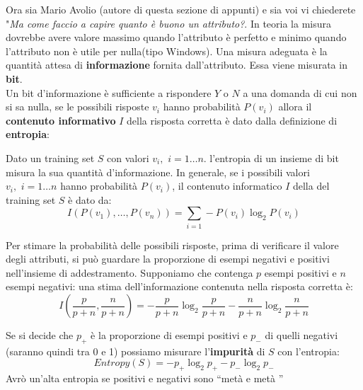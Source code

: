 Ora sia Mario Avolio (autore di questa sezione di appunti) e sia voi vi chiederete "\textit{Ma come faccio a capire quanto è buono un attributo?}. In teoria la misura dovrebbe avere valore massimo quando l'attributo è perfetto e minimo quando l'attributo non è utile per nulla(tipo Windows). Una misura adeguata è la quantità attesa di \textbf{informazione} fornita dall'attributo. Essa viene misurata in \textbf{bit}. \\ Un bit d'informazione è sufficiente a rispondere $Y$ o $N$ a una domanda di cui non si sa nulla, se le possibili risposte $v_i$ hanno probabilità $P(v_i)$ allora il \textbf{contenuto informativo} $I$ della risposta corretta è dato dalla definizione di \textbf{entropia}:
\begin{definizione}
  Dato un training set $S$ con valori $v_i,\,\, i=1\ldots n$. l'entropia di un
  insieme di bit misura la sua quantità d'informazione. In generale, se i possibili valori $v_i,\,\, i=1\ldots n$ hanno probabilità $P(v_i)$, il contenuto informatico $I$ della del training set $S$ è dato da:
  \[I(P(v_1),\ldots, P(v_n))=\sum_{i=1}-P(v_i)\log_2P(v_i)\]
  \end{definizione}
  \begin{definizione}
      Per stimare la probabilità delle possibili risposte, prima di verificare il valore degli attributi, si può guardare la proporzione di esempi negativi e positivi nell'insieme di addestramento. Supponiamo che contenga $p$ esempi positivi e $n$ esempi negativi: una stima dell'informazione contenuta nella risposta corretta è:
  \[I\left(\frac{p}{p+n},\frac{n}{p+n}\right)=-\frac{p}{p+n}\log_2\frac{p}{p+n}
    -\frac{n}{p+n}\log_2\frac{n}{p+n}\] 
      \end{definizione}
\begin{definizione}
    Se si decide che $p_+$ è la proporzione di esempi positivi e $p_-$ di
  quelli negativi (saranno quindi tra 0 e 1) possiamo misurare
  l'\textbf{impurità} di $S$ con l'entropia: 
  \[Entropy(S)=-p_+\log_2 p_+-p_-\log_2 p_-\]
  Avrò un'alta entropia se positivi e negativi sono ``metà e metà ''
  \end{definizione}


